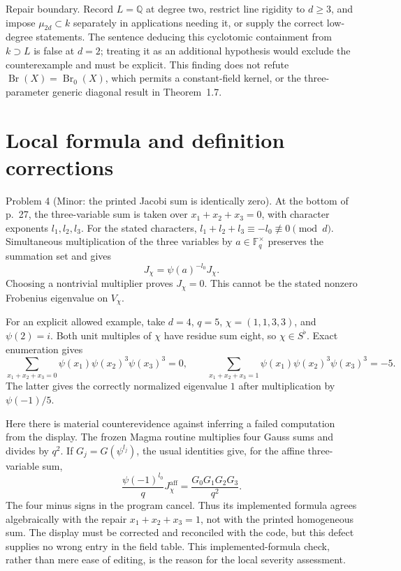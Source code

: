 \documentclass[10pt]{article}
\begin{document}
Repair boundary. Record \(L=\mathbb{Q}\) at degree two, restrict line rigidity to \(d\ge3\), and impose \(\mu_{2d}\subset k\) separately in applications needing it, or supply the correct low-degree statements. The sentence deducing this cyclotomic containment from \(k\supset L\) is false at \(d=2\); treating it as an additional hypothesis would exclude the counterexample and must be explicit. This finding does not refute \(\mathop{\mathrm{Br}}(X)=\mathop{\mathrm{Br}}_0(X)\), which permits a constant-field kernel, or the three-parameter generic diagonal result in Theorem 1.7.\par
\section*{Local formula and definition corrections}
Problem 4 (Minor: the printed Jacobi sum is identically zero).  At the bottom of p. 27, the three-variable sum is taken over \(x_1+x_2+x_3=0\), with character exponents \(l_1,l_2,l_3\). For the stated characters, \(l_1+l_2+l_3\equiv-l_0\not\equiv0\pmod d\). Simultaneous multiplication of the three variables by \(a\in\mathbb F_q^\times\) preserves the summation set and gives \[J_\chi=\psi(a)^{-l_0}J_\chi.\] Choosing a nontrivial multiplier proves \(J_\chi=0\). This cannot be the stated nonzero Frobenius eigenvalue on \(V_\chi\).\par
For an explicit allowed example, take \(d=4\), \(q=5\), \(\chi=(1,1,3,3)\), and \(\psi(2)=i\). Both unit multiples of \(\chi\) have residue sum eight, so \(\chi\in S^\flat\). Exact enumeration gives \[\sum_{x_1+x_2+x_3=0}\psi(x_1)\psi(x_2)^3\psi(x_3)^3=0,
 \qquad
 \sum_{x_1+x_2+x_3=1}\psi(x_1)\psi(x_2)^3\psi(x_3)^3=-5.\] The latter gives the correctly normalized eigenvalue \(1\) after multiplication by \(\psi(-1)/5\).\par
Here there is material counterevidence against inferring a failed computation from the display. The frozen Magma routine multiplies four Gauss sums and divides by \(q^2\). If \(G_j=G(\psi^{l_j})\), the usual identities give, for the affine three-variable sum, \[\frac{\psi(-1)^{l_0}}q J_\chi^{\mathrm{aff}}
   =\frac{G_0G_1G_2G_3}{q^2}.\] The four minus signs in the program cancel. Thus its implemented formula agrees algebraically with the repair \(x_1+x_2+x_3=1\), not with the printed homogeneous sum. The display must be corrected and reconciled with the code, but this defect supplies no wrong entry in the field table. This implemented-formula check, rather than mere ease of editing, is the reason for the local severity assessment.\par
\end{document}
